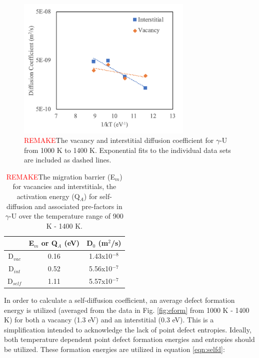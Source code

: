 \documentclass[review]{elsarticle}
\begin{document}
 \begin{figure}[h]
 \centering
 \includegraphics[width=0.75\textwidth]{diff.png} 
 \caption{\textcolor{red}{REMAKE}The vacancy and interstitial diffusion coefficient for $\gamma$-U from 1000 K to 1400 K. Exponential fits to the individual data sets are included as dashed lines.}
 \label{fig:diff}
\end{figure}

\FloatBarrier

\begin{table}[h]
\caption{\textcolor{red}{REMAKE}The migration barrier (E$_m$) for vacancies and interstitials, the activation energy (Q$_A$) for self-diffusion and associated pre-factors in $\gamma$-U over the temperature range of 900 K - 1400 K.}  \label{tab:diff}
\begin{center}
\begin{tabular}{|c|c|c|}
	\hline
	 & E$_m$ or Q$_A$ (eV) & D$_0$ (m$^2$/s) \\
	 \hline
	 D$_{vac}$ & 0.16 & 1.43x10$^{-8}$ \\
	 D$_{int}$ & 0.52 & 5.56x10$^{-7}$ \\
	 D$_{self}$ & 1.11 & 5.57x10$^{-7}$ \\
	 \hline
\end{tabular}
\end{center}
\label{default}
\end{table}

In order to calculate a self-diffusion coefficient, an average defect formation energy is utilized (averaged from the data in Fig. \ref{fig:eform} from 1000 K - 1400 K) for both a vacancy (1.3 eV) and an interstitial (0.3 eV). This is a simplification intended to acknowledge the lack of point defect entropies. Ideally, both temperature dependent point defect formation energies and entropies should be utilized. These formation energies are utilized in equation \ref{eqn:selfd}:
\end{document}
